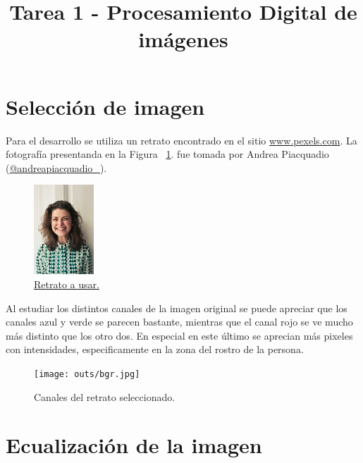 \documentclass[letterpaper,9pt,journal,final]{IEEEtran}
\title{Tarea 1 - Procesamiento Digital de imágenes}
\author{
        \IEEEauthorblockN{Pablo Yáñez S.}
        \IEEEauthorblockA{%
             - pablo.yanez@uai.cl}
        }
\date{}
\begin{document}
\maketitle


\hypertarget{selecciuxf3n-de-imagen}{%
\section{Selección de imagen}\label{selecciuxf3n-de-imagen}}

Para el desarrollo se utiliza un retrato encontrado en el sitio
\href{pexels.com}{www.pexels.com}. La fotografía presentanda en
la Figura ~\ref{fig:retrato}. fue tomada por Andrea Piacquadio
(\href{https://www.instagram.com/andreapiacquadio_/}{@andreapiacquadio\_}).

\begin{figure}[h!]
\hypertarget{fig:retrato}{%
\centering
\includegraphics[width=0.2\textwidth]{portrait.jpg}
\caption{\href{https://www.pexels.com/photo/women-s-white-and-black-button-up-collared-shirt-774909/}{Retrato
a usar.}}\label{fig:retrato}
}
\end{figure}

Al estudiar los distintos canales de la imagen original se puede
apreciar que los canales azul y verde se parecen bastante, mientras que
el canal rojo se ve mucho más distinto que los otro dos. En especial en
este último se aprecian más pixeles con intensidades, especificamente en
la zona del rostro de la persona.

\begin{figure}[h!]
\hypertarget{fig:canales_retrato}{%
\centering
\texttt{[image: outs/bgr.jpg]}
\caption{Canales del retrato seleccionado.}\label{fig:canales_retrato}
}
\end{figure}

\hypertarget{equalizaciuxf3n-de-la-imagen}{%
\section{Ecualización de la imagen}\label{equalizaciuxf3n-de-la-imagen}}
\end{document}
